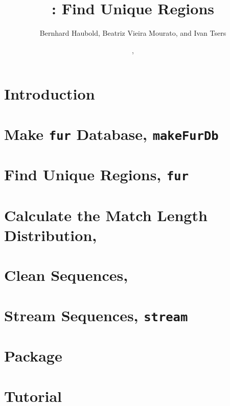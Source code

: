 \documentclass[a4paper]{report}
\begin{document}
\pagestyle{noweb}

\title{: Find Unique Regions}
\author{Bernhard Haubold, Beatriz Vieira Mourato, and Ivan Tsers}
\date{\hspace{-0.11cm}, }
\maketitle

\tableofcontents

\chapter{Introduction}\label{sec:intro}

\chapter{Make \texttt{fur} Database, \texttt{makeFurDb}}\label{ch:makeFurDb}

\chapter{Find Unique Regions, \texttt{fur}}

\chapter{Calculate the Match Length Distribution, }\label{ch:mad}

\chapter{Clean Sequences, }

\chapter{Stream Sequences, \texttt{stream}}

\chapter{Package }

\chapter{Tutorial}\label{ch:tut}



\end{document}
